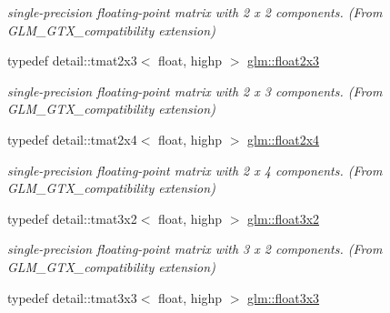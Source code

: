 \begin{CompactItemize}
\begin{CompactList}\small\item\em single-precision floating-point matrix with 2 x 2 components. (From GLM\_\-GTX\_\-compatibility extension) \item\end{CompactList}\item 
\hypertarget{group__gtx__compatibility_gf6c91675c075853da392b1d2dfc45f65}{
typedef detail::tmat2x3$<$ float, highp $>$ \hyperlink{group__gtx__compatibility_gf6c91675c075853da392b1d2dfc45f65}{glm::float2x3}}
\label{group__gtx__compatibility_gf6c91675c075853da392b1d2dfc45f65}

\begin{CompactList}\small\item\em single-precision floating-point matrix with 2 x 3 components. (From GLM\_\-GTX\_\-compatibility extension) \item\end{CompactList}\item 
\hypertarget{group__gtx__compatibility_gaff795523eb814705d3f1cc7fd3421f2}{
typedef detail::tmat2x4$<$ float, highp $>$ \hyperlink{group__gtx__compatibility_gaff795523eb814705d3f1cc7fd3421f2}{glm::float2x4}}
\label{group__gtx__compatibility_gaff795523eb814705d3f1cc7fd3421f2}

\begin{CompactList}\small\item\em single-precision floating-point matrix with 2 x 4 components. (From GLM\_\-GTX\_\-compatibility extension) \item\end{CompactList}\item 
\hypertarget{group__gtx__compatibility_g19bcbd4d65c70cd07907b2d688bc84ed}{
typedef detail::tmat3x2$<$ float, highp $>$ \hyperlink{group__gtx__compatibility_g19bcbd4d65c70cd07907b2d688bc84ed}{glm::float3x2}}
\label{group__gtx__compatibility_g19bcbd4d65c70cd07907b2d688bc84ed}

\begin{CompactList}\small\item\em single-precision floating-point matrix with 3 x 2 components. (From GLM\_\-GTX\_\-compatibility extension) \item\end{CompactList}\item 
\hypertarget{group__gtx__compatibility_g11458ecd63c32b7e502d90091a6d0a6c}{
typedef detail::tmat3x3$<$ float, highp $>$ \hyperlink{group__gtx__compatibility_g11458ecd63c32b7e502d90091a6d0a6c}{glm::float3x3}}
\label{group__gtx__compatibility_g11458ecd63c32b7e502d90091a6d0a6c}


\end{CompactItemize}
